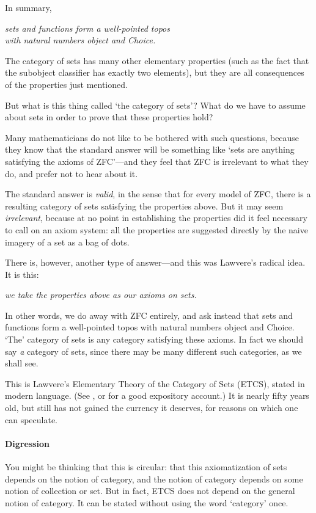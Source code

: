 \documentclass{article}
\newcommand{\slogan}[1]{\begin{center}\it #1\end{center}}
\begin{document}
In summary,
% 
\slogan{sets and functions form a well-pointed topos\\
with natural numbers object and Choice.}
% 
The category of sets has many other elementary properties (such as the fact
that the subobject classifier has exactly two elements), but they are all
consequences of the properties just mentioned.

But what is this thing called `the category of sets'?  What do we have to
assume about sets in order to prove that these properties hold?  

Many mathematicians do not like to be bothered with such questions, because
they know that the standard answer will be something like `sets are anything
satisfying the axioms of ZFC'---and they feel that ZFC is irrelevant to what
they do, and prefer not to hear about it.

The standard answer is \emph{valid}, in the sense that for every model of
ZFC, there is a resulting category of sets satisfying the properties
above.  But it may seem \emph{irrelevant}, because at no point in establishing
the properties did it feel necessary to call on an axiom system: all the
properties are suggested directly by the naive imagery of a set as a bag of
dots.  

There is, however, another type of answer---and this was Lawvere's radical
idea.  It is this: 
% 
\slogan{we take the properties above as our axioms on sets.}
% 
In other words, we do away with ZFC entirely, and ask instead that sets and
functions form a well-pointed topos with natural numbers object and Choice.
`The' category of sets is any category satisfying these axioms.  In fact we
should say \emph{a} category of sets, since there may be many different such
categories, as we shall see.

This is Lawvere's Elementary Theory of the Category of Sets (ETCS), stated in
modern language.  (See \citet{LawETCS}, or \citet{LaRo} for a good expository
account.)  It is nearly fifty years old, but still has not gained the currency
it deserves, for reasons on which one can speculate.

\paragraph*{Digression} You might be thinking that this is circular: that this
axiomatization of sets 
depends on the notion of category, and the notion of category depends on some
notion of collection or set.  But in fact, ETCS does not depend on the general
notion of category.  It can be stated without using the word `category' once.
\end{document}
